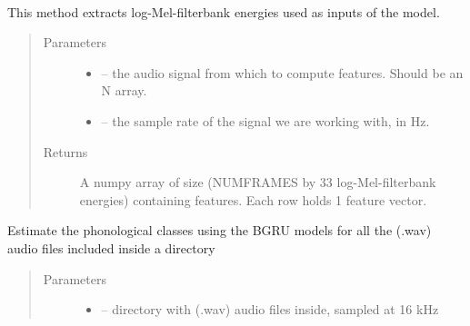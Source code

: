 \documentclass[letterpaper,10pt,english]{sphinxmanual}
\begin{document}
\begin{fulllineitems}
\label{\detokenize{index:phonet.Phonet}}~

\begin{fulllineitems}
\label{\detokenize{index:phonet.Phonet.get_feat}}
This method extracts log-Mel-filterbank energies used as inputs
of the model.
\begin{quote}\begin{description}
\item[{Parameters}] \leavevmode\begin{itemize}
\item {} 
 -- the audio signal from which to compute features. Should be an N array.

\item {} 
 -- the sample rate of the signal we are working with, in Hz.

\end{itemize}

\item[{Returns}] \leavevmode
A numpy array of size (NUMFRAMES by 33 log-Mel-filterbank energies) containing features. Each row holds 1 feature vector.

\end{description}\end{quote}

\end{fulllineitems}


\begin{fulllineitems}
\label{\detokenize{index:phonet.Phonet.get_phon_path}}
Estimate the phonological classes using the BGRU models for all the (.wav) audio files included inside a directory
\begin{quote}\begin{description}
\item[{Parameters}] \leavevmode\begin{itemize}
\item {} 
 -- directory with (.wav) audio files inside, sampled at 16 kHz


\end{itemize}
\end{description}
\end{quote}
\end{fulllineitems}
\end{fulllineitems}
\end{document}
